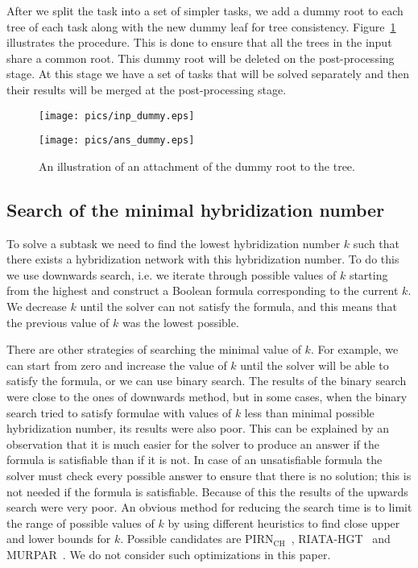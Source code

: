 \documentclass[runningheads, envcountsame, a4paper]{llncs}
\begin{document}
After we split the task into a set of simpler tasks, we add a dummy root to each tree of each task along with 
the new dummy leaf for tree consistency. Figure~\ref{dummy-example} illustrates the procedure. 
This is done to ensure that all the trees in the input share a common root. 
This dummy root will be deleted on the post-processing stage. At this stage we have a set of tasks that will be solved 
separately and then their results will be merged at the post-processing stage.

\begin{figure}[t]
  \centering
  \begin{minipage}[b]{0.39\linewidth}
    \texttt{[image: pics/inp\_dummy.eps]}
  \end{minipage}
  \hfill
  \begin{minipage}[b]{0.59\linewidth}
    \texttt{[image: pics/ans\_dummy.eps]}
  \end{minipage}
  \caption{An illustration of an attachment of the dummy root to the tree.}
  \label{dummy-example}
\end{figure}

\subsection{Search of the minimal hybridization number}

To solve a subtask we need to find the lowest hybridization number $k$ such that there exists a hybridization 
network with this hybridization number. To do this we use downwards search, i.e. we iterate through possible values of $k$ starting from the highest 
and construct a Boolean formula corresponding to the current $k$. 
We decrease $k$ until the solver can not satisfy the formula, and this means that the previous value of $k$ was the 
lowest possible.

There are other strategies of searching the minimal value of $k$. For example, we can start from 
zero and increase the value of $k$ until the solver will be able to satisfy the formula, or we can use binary search. 
The results of the binary search were close to the ones of downwards method, 
but in some cases, when the binary search tried to satisfy formulae with values of $k$ less than minimal possible hybridization number, 
its results were also poor. 
This can be explained by an observation that it is much easier for the solver to produce an answer if the formula is satisfiable than if it is not. 
In case of an unsatisfiable formula the solver must check every possible answer to ensure that there is no solution; this is not needed if the 
formula is satisfiable. Because of this the results of the upwards search were very poor. An obvious method 
for reducing the search time is to limit the range of possible values of $k$ by using different heuristics to find close upper and lower bounds for $k$. 
Possible candidates are PIRN$\mathrm{_{CH}}$~\cite{wu2013algorithm}, RIATA-HGT~\cite{nakhleh2005riata} and MURPAR~\cite{park2012murpar}. We do not consider such optimizations in this paper.
\end{document}
